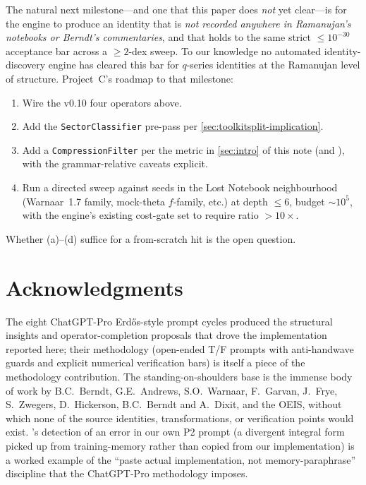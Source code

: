 \documentclass[11pt,reqno]{amsart}
\theoremstyle{definition}
\begin{document}
The natural next milestone---and one that this paper does \emph{not}
yet clear---is for the engine to produce an identity that is \emph{not
recorded anywhere in Ramanujan's notebooks or Berndt's
commentaries}, and that holds to the same strict $\le 10^{-30}$
acceptance bar across a $\ge 2$-dex sweep. To our knowledge no
automated identity-discovery engine has cleared this bar for
$q$-series identities at the Ramanujan level of structure.
Project~C's roadmap to that milestone:
\begin{enumerate}[label=(\alph*)]
\item Wire the v0.10 four operators above.
\item Add the \verb|SectorClassifier| pre-pass per
  \cref{sec:toolkitsplit-implication}.
\item Add a \verb|CompressionFilter| per the metric in
  \cref{sec:intro} of this note (and \cite[diary~39]{ProjectC}),
  with the grammar-relative caveats explicit.
\item Run a directed sweep against seeds in the Lost Notebook
  neighbourhood (Warnaar~1.7 family, mock-theta $f$-family, etc.)
  at depth $\le 6$, budget $\sim 10^5$, with the engine's existing
  cost-gate set to require ratio $> 10\times$.
\end{enumerate}

Whether (a)--(d) suffice for a from-scratch hit is the open question.

\section*{Acknowledgments}

The eight ChatGPT-Pro Erd\H{o}s-style prompt cycles
\cite[diaries~35, 37, 38, 39, 40, 41, 42, plus the v0.8a
proposer-test that preceded them]{ProjectC} produced the structural
insights and operator-completion proposals that drove the
implementation reported here; their methodology (open-ended T/F
prompts with anti-handwave guards and explicit numerical
verification bars) is itself a piece of the methodology
contribution. The standing-on-shoulders base is the immense body of
work by B.C.\ Berndt, G.E.\ Andrews, S.O.\ Warnaar, F.\ Garvan,
J.\ Frye, S.\ Zwegers, D.\ Hickerson, B.C.\ Berndt and A.\ Dixit,
and the OEIS, without which none of the source identities,
transformations, or verification points would exist.
\cite[diary~41]{ProjectC}'s detection of an error in our own P2
prompt (a divergent integral form picked up from training-memory
rather than copied from our implementation) is a worked example of
the ``paste actual implementation, not memory-paraphrase''
discipline that the ChatGPT-Pro methodology imposes.
\end{document}
